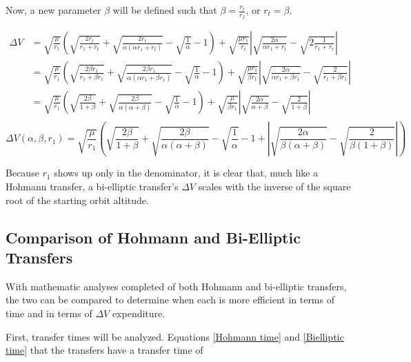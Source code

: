 \documentclass{article}
\begin{document}
Now, a new parameter $\beta$ will be defined such that $\beta=\frac{r_t}{r_1}$, or $r_t=\beta$.

\begin{align*}
    \Delta V & = \sqrt{\frac{\mu}{r_1}}\left(\sqrt{\frac{2r_t}{r_1+r_t}}+\sqrt{\frac{2r_t}{\alpha(\alpha r_1+r_t)}}-\sqrt{\frac{1}{\alpha}}-1\right)+\sqrt{\frac{\mu r_1}{r_t}}\left|\sqrt{\frac{2\alpha}{\alpha r_1+r_t}}-\sqrt{2\frac{1}{r_1+r_t}}\right|                                         \\
             & =\sqrt{\frac{\mu}{r_1}}\left(\sqrt{\frac{2\beta r_1}{r_1+\beta r_1}}+\sqrt{\frac{2\beta r_1}{\alpha(\alpha r_1+\beta r_1)}}-\sqrt{\frac{1}{\alpha}}-1\right)+\sqrt{\frac{\mu r_1}{\beta r_1}}\left|\sqrt{\frac{2\alpha}{\alpha r_1+\beta r_1}}-\sqrt{\frac{2}{r_1+\beta r_1}}\right| \\
             & =\sqrt{\frac{\mu}{r_1}}\left(\sqrt{\frac{2\beta}{1+\beta}}+\sqrt{\frac{2\beta}{\alpha(\alpha+\beta)}}-\sqrt{\frac{1}{\alpha}}-1\right)+\sqrt{\frac{\mu}{\beta r_1}}\left|\sqrt{\frac{2\alpha}{\alpha+\beta}}-\sqrt{\frac{2}{1+\beta}}\right|                                         \\
\end{align*}
\begin{equation}\label{Bi-Elliptic DeltaV in terms of alpha, beta, r1}
    \Delta V(\alpha,\beta,r_1) = \sqrt{\frac{\mu}{r_1}}\left(\sqrt{\frac{2\beta}{1+\beta}}+\sqrt{\frac{2\beta}{\alpha(\alpha+\beta)}}-\sqrt{\frac{1}{\alpha}}-1+\left|\sqrt{\frac{2\alpha}{\beta(\alpha+\beta)}}-\sqrt{\frac{2}{\beta(1+\beta)}}\right|\right)
\end{equation}

Because $r_1$ shows up only in the denominator, it is clear that, much like a Hohmann transfer, a bi-elliptic transfer's $\Delta V$ scales with the inverse of the square root of the starting orbit altitude.

\subsection{Comparison of Hohmann and Bi-Elliptic Transfers}

With mathematic analyses completed of both Hohmann and bi-elliptic transfers, the two can be compared to determine when each is more efficient in terms of time and in terms of $\Delta V$ expenditure.

First, transfer times will be analyzed. Equations \eqref{Hohmann time} and \eqref{Bielliptic time} that the transfers have a transfer time of
\end{document}
